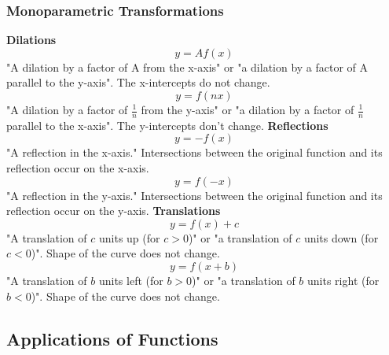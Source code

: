 \documentclass{article}
\begin{document}
			\subsubsection{Monoparametric Transformations}
				\textbf{Dilations}
				\[y=Af(x)\]
				"A dilation by a factor of A from the x-axis" or "a dilation by a factor of A parallel to the y-axis". The x-intercepts do not change.\newline
				\[y=f(nx)\]
				"A dilation by a factor of $\frac{1}{n}$ from the y-axis" or "a dilation by a factor of $\frac{1}{n}$ parallel to the x-axis". The y-intercepts don't change.\newline\newline
				\textbf{Reflections}
				\[y=-f(x)\]
				"A reflection in the x-axis."\newline
				Intersections between the original function and its reflection occur on the x-axis.\newline
				\[y=f(-x)\]
				"A reflection in the y-axis."\newline
				Intersections between the original function and its reflection occur on the y-axis.\newline\newline
				\textbf{Translations}
				\[y=f(x)+c\]
				"A translation of $c$ units up (for $c > 0$)" or "a translation of $c$ units down (for $c < 0$)".\newline
				Shape of the curve does not change.\newline
				\[y=f(x+b)\]
				"A translation of $b$ units left (for $b > 0$)" or "a translation of $b$ units right (for $b < 0$)".\newline
				Shape of the curve does not change.\newline
		\subsection{Applications of Functions}
\end{document}
